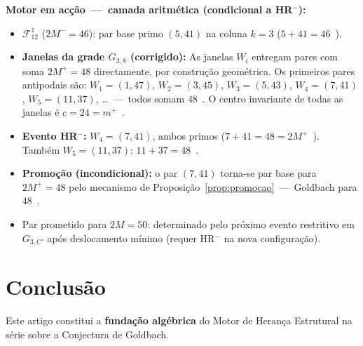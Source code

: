 \documentclass[12pt, a4paper]{article}
\theoremstyle{plain}
\theoremstyle{definition}
\theoremstyle{remark}
\begin{document}
	\medskip\noindent\textbf{Motor em acção~---~camada aritmética
		(condicional a HR$^-$):}
	\begin{itemize}
		\item $\mathcal{F}_{12}^1$ ($2M^-=46$): par base primo $(5,41)$
		na coluna $k=3$ ($5+41=46$~\checkmark).
		\item \textbf{Janelas da grade $G_{3,8}$ (corrigido):}
		As janelas $W_i$ entregam pares com soma $2M^+=48$ directamente,
		por construção geométrica.  Os primeiros pares antipodais são:
		$W_1=(1,47)$, $W_2=(3,45)$, $W_3=(5,43)$, $W_4=(7,41)$,
		$W_5=(11,37)$, \ldots~---~todos somam $48$~\checkmark.
		O centro invariante de todas as janelas é $c=24=m^+$~\checkmark.
		\item \textbf{Evento HR$^-$:} $W_4=(7,41)$, ambos primos
		($7+41=48=2M^+$~\checkmark).  Também $W_5=(11,37)$: $11+37=48$~\checkmark.
		\item \textbf{Promoção (incondicional):} o par $(7,41)$ torna-se
		par base para $2M^+=48$ pelo mecanismo de
		Proposição~\ref{prop:promocao}~---~Goldbach para
		$48$~\checkmark.
		\item Par prometido para $2M=50$: determinado pelo próximo
		evento restritivo em $G_{3,C'}$ após deslocamento mínimo
		(requer HR$^-$ na nova configuração).
	\end{itemize}
	
	\section{Conclusão}
	\label{sec:conclusao}
	
	Este artigo constitui a \textbf{fundação algébrica} do Motor de
	Herança Estrutural na série sobre a Conjectura de Goldbach.
	
\end{document}
